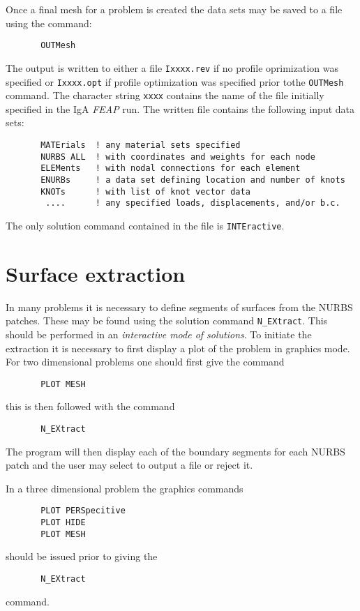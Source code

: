 Once a final mesh for a problem is created the data sets may be 
saved to a file using the command:
\begin{verbatim}
       OUTMesh
\end{verbatim}
The output is written to either a file \texttt{Ixxxx.rev} if no profile 
oprimization was specified or \texttt{Ixxxx.opt} if profile optimization was
specified prior tothe \texttt{OUTMesh} command.  The character string
\texttt{xxxx} contains the name of the file initially specified in the
IgA \textsl{FEAP} run.  The written file contains the following input data sets:
\begin{verbatim}
       MATErials  ! any material sets specified
       NURBS ALL  ! with coordinates and weights for each node
       ELEMents   ! with nodal connections for each element
       ENURBs     ! a data set defining location and number of knots
       KNOTs      ! with list of knot vector data
        ....      ! any specified loads, displacements, and/or b.c.
\end{verbatim}
The only solution command contained in the file is \texttt{INTEractive}.

\section{Surface extraction}

In many problems it is necessary to define segments of surfaces from the
NURBS patches. These may be found using the solution command \texttt{N\_EXtract}.
This should be performed in an \textit{interactive mode of solutions}.
To initiate the extraction it is necessary to first display a plot of the
problem in graphics mode.  For two dimensional problems one should first
give the command
\begin{verbatim}
       PLOT MESH
\end{verbatim}
this is then followed with the command
\begin{verbatim}
       N_EXtract
\end{verbatim}
The program will then display each of the boundary segments for each NURBS
patch and the user may select to output a file or reject it.

In a three dimensional problem the graphics commands
\begin{verbatim}
       PLOT PERSpecitive
       PLOT HIDE
       PLOT MESH
\end{verbatim}
should be issued prior to giving the
\begin{verbatim}
       N_EXtract
\end{verbatim}
command.

